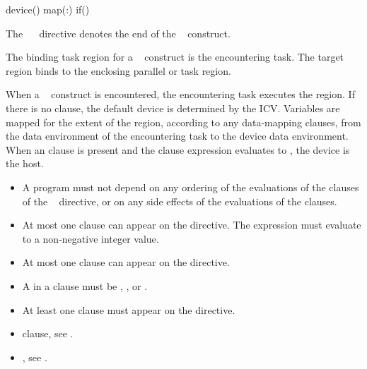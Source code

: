 \begin{indentedcodelist}
device()
map(\plc{[[map-type-modifier[,]] map-type}:\plc{ ] list})
if()
\end{indentedcodelist}

The ~~ directive denotes the end of the ~ construct.
\fortranspecificend

\binding
The binding task region for a ~ construct is the encountering task. The 
target region binds to the enclosing parallel or task region.

\descr
When a ~ construct is encountered, the encountering task executes the region. If there is no  clause, the default device is determined by the  ICV. Variables are mapped for the extent of the region, according to any data-mapping clauses, from the data environment of the encountering task to the device data environment. When an  clause is present and the  clause expression evaluates to , the device is the host.

\restrictions
\begin{itemize}
\item A program must not depend on any ordering of the evaluations of the clauses of the 
~ directive, or on any side effects of the evaluations of the clauses.

\item At most one  clause can appear on the directive. The  expression 
must evaluate to a non-negative integer value.

\item At most one  clause can appear on the directive. 
\item A  in a  clause must be , ,  or .
\item At least one  clause must appear on the directive. 
\end{itemize}

\crossreferences
\begin{itemize}
\item {} clause, see 
.

\item {}, see 
. 
\end{itemize}










